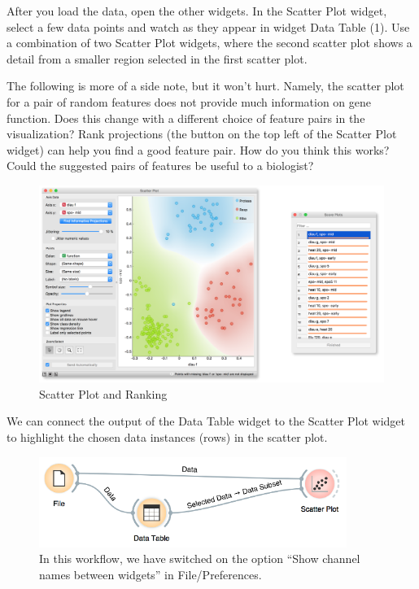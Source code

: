 After you load the data, open the other widgets. In the Scatter Plot widget, select a few data points and watch as they appear in widget Data Table (1). Use a combination of two Scatter Plot widgets, where the second scatter plot shows a detail from a smaller region selected in the first scatter plot.

The following is more of a side note, but it won’t hurt. Namely, the scatter plot for a pair of random features does not provide much information on gene function. Does this change with a different choice of feature pairs in the visualization? Rank projections (the button on the top left of the Scatter Plot widget) can help you find a good feature pair. How do you think this works? Could the suggested pairs of features be useful to a biologist?

\begin{figure}[h]
  \centering
  \includegraphics[width=\linewidth]{workflow-fig4b.png}
  \caption{Scatter Plot and Ranking}
  \label{fig:workflow-fig4}
\end{figure}


We can connect the output of the Data Table widget to the Scatter Plot widget to highlight the chosen data instances (rows) in the scatter plot.

\begin{figure}
  \includegraphics[width=100mm]{workflow-fig5.png}
  \caption{In this workflow, we have switched on the option “Show channel names between widgets” in File/Preferences.}
  \label{fig:workflow-fig5}
\end{figure}

